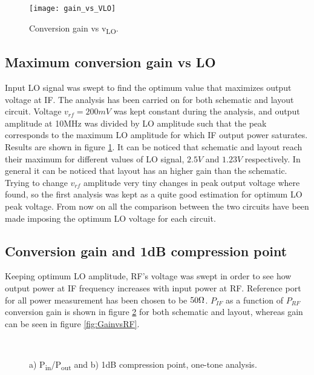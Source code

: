 \begin{figure}[H]
	\centering
	\texttt{[image: gain\_vs\_VLO]}
	\caption{Conversion gain vs v\textsubscript{LO}.}
	\label{fig:maxGainvsLO}
\end{figure}

\subsection{Maximum conversion gain vs LO}
Input LO signal was swept to find the optimum value that maximizes output voltage at IF. The analysis has been carried on for both schematic and layout circuit. Voltage \(v_{rf}=200mV\) was kept constant during the analysis, and output amplitude at 10MHz was divided by LO amplitude such that the peak corresponds to the maximum LO amplitude for which IF output power saturates. Results are shown in figure \ref{fig:maxGainvsLO}. It can be noticed that schematic and layout reach their maximum for different values of LO signal, \(2.5V\) and \(1.23V\) respectively. In general it can be noticed that layout has an higher gain than the schematic. Trying to change \(v_{rf}\) amplitude very tiny changes in peak output voltage where found, so the first analysis was kept as a quite good estimation for optimum LO peak voltage. From now on all the comparison between the two circuits have been made imposing the optimum LO voltage for each circuit.


\subsection{Conversion gain and 1dB compression point}
Keeping optimum LO amplitude, RF's voltage was swept in order to see how output power at IF frequency increases with input power at RF. Reference port for all power measurement has been chosen to be \(50\ohm\). \(P_{IF}\) as a function of \(P_{RF}\) conversion gain is shown in figure \ref{fig:PinPout1T_1dBCp} for both schematic and layout, whereas gain can be seen in figure \ref{fig:GainvsRF}. 
\begin{figure}[H] 
	\centering
	 \\
	\caption{a) P\textsubscript{in}/P\textsubscript{out} and  b) 1dB compression point, one-tone analysis.}
	\label{fig:PinPout1T_1dBCp}
\end{figure}

